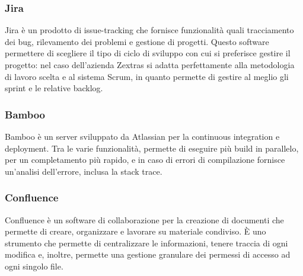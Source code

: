 \subsubsection{Jira}\label{subsubsec:jira}
Jira è un prodotto di issue-tracking che fornisce funzionalità quali tracciamento dei bug, rilevamento dei problemi e gestione di progetti. Questo software permettere di scegliere il tipo di ciclo di sviluppo con cui si preferisce gestire il progetto: nel caso dell'azienda Zextras si adatta perfettamente alla metodologia di lavoro scelta e al sistema Scrum, in quanto permette di gestire al meglio gli sprint e le relative backlog.
\subsubsection{Bamboo}\label{subsubsec:bamboo}
Bamboo è un server sviluppato da Atlassian per la continuous integration e deployment. Tra le varie funzionalità, permette di eseguire più build in parallelo, per un completamento più rapido, e in caso di errori di compilazione fornisce un'analisi dell'errore, inclusa la stack trace.
\subsubsection{Confluence}\label{subsubsec:confluence}
Confluence è un software di collaborazione per la creazione di documenti che permette di creare, organizzare e lavorare su materiale condiviso. È uno strumento che permette di centralizzare le informazioni, tenere traccia di ogni modifica e, inoltre, permette una gestione granulare dei permessi di accesso ad ogni singolo file.

